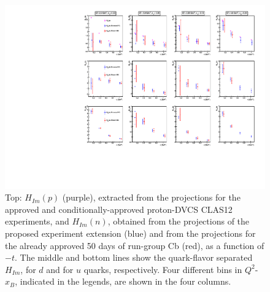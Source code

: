 \begin{figure}  
\begin{center}
\includegraphics[width=160mm]{flavors_h_im_compare3.pdf}
\caption[Flavor separation of the $H_{Im}$ CFF]
{Top: ${H}_{Im}(p)$ (purple), extracted from the projections for the approved and conditionally-approved proton-DVCS CLAS12 experiments, and ${H}_{Im}(n)$, obtained from the projections of the proposed experiment extension (blue) and from the projections for the already approved 50 days of run-group Cb (red), as a function of $-t$. The middle and bottom lines show the quark-flavor separated ${H}_{Im}$, for $d$ and for $u$ quarks, respectively. Four different bins in $Q^2$-$x_B$, indicated in the legends, are shown in the four columns.}\label{flavor_h_im}
\end{center}
\end{figure}

